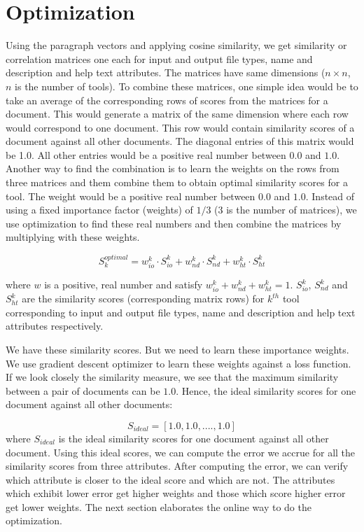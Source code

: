 \section{Optimization}
Using the paragraph vectors and applying cosine similarity, we get similarity or correlation matrices one each for input and output file types, name and description and help text attributes. The matrices have same dimensions ($n \times n$, $n$ is the number of tools). To combine these matrices, one simple idea would be to take an average of the corresponding rows of scores from the matrices for a document. This would generate a matrix of the same dimension where each row would correspond to one document. This row would contain similarity scores of a document against all other documents. The diagonal entries of this matrix would be 1.0. All other entries would be a positive real number between $0.0$ and $1.0$. Another way to find the combination is to learn the weights on the rows from three matrices and them combine them to obtain optimal similarity scores for a tool. The weight would be a positive real number between $0.0$ and $1.0$. Instead of using a fixed importance factor (weights) of $1 / 3$ ($3$ is the number of matrices), we use optimization to find these real numbers and then combine the matrices by multiplying with these weights.

\begin{equation}
S_k^{optimal} = w^k_{io} \cdot S^k_{io} +  w^k_{nd} \cdot S^k_{nd} + w^k_{ht} \cdot S^k_{ht}
\end{equation}

where $w$ is a positive, real number and satisfy $w^k_{io} + w^k_{nd} + w^k_{ht} = 1$. 
$S^k_{io}$, $S^k_{nd}$ and $S^k_{ht}$ are the similarity scores (corresponding matrix rows) for $k^{th}$ tool corresponding to input and output file types, name and description and help text attributes respectively.

We have these similarity scores. But we need to learn these importance weights. We use gradient descent optimizer to learn these weights against a loss function. If we look closely the similarity measure, we see that the maximum similarity between a pair of documents can be $1.0$. Hence, the ideal similarity scores for one document against all other documents:

\begin{equation}
S_{ideal} = [ 1.0, 1.0, ...., 1.0 ]
\end{equation}
where $S_{ideal}$ is the ideal similarity scores for one document against all other document. Using this ideal scores, we can compute the error we accrue for all the similarity scores from three attributes. After computing the error, we can verify which attribute is closer to the ideal score and which are not. The attributes which exhibit lower error get higher weights and those which score higher error get lower weights. The next section elaborates the online way to do the optimization.


